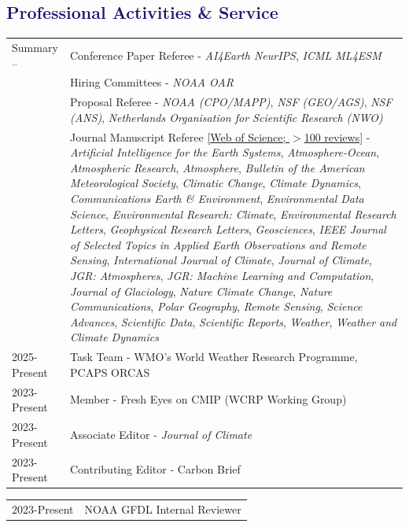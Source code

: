 \documentclass[margin,line,palatino,courier,10pt]{res}
\begin{document}
\begin{resume}
\section{\sc \textcolor{MidnightBlue}{\large{\textbf{Professional Activities \& Service}}}}
\vspace*{0.05in}
\begin{tabular}{@{}p{0.9in}p{4in}}
 Summary -- & Conference Paper Referee - \textit{AI4Earth NeurIPS}, \textit{ICML ML4ESM}\\
 & Hiring Committees - \textit{NOAA OAR}\\
 & Proposal Referee - \textit{NOAA (CPO/MAPP)}, \textit{NSF (GEO/AGS)}, \textit{NSF (ANS)}, \textit{Netherlands Organisation for Scientific Research (NWO)}\\
 & Journal Manuscript Referee \href{https://www.webofscience.com/wos/author/record/J-4764-2019}{[Web of Science; $>$100 reviews]} - \textit{Artificial Intelligence for the Earth Systems}, \textit{Atmosphere-Ocean}, \textit{Atmospheric Research}, \textit{Atmosphere}, \textit{Bulletin of the American Meteorological Society}, \textit{Climatic Change}, \textit{Climate Dynamics}, \textit{Communications Earth \& Environment}, \textit{Environmental Data Science}, \textit{Environmental Research: Climate}, \textit{Environmental Research Letters}, \textit{Geophysical Research Letters}, \textit{Geosciences}, \textit{IEEE Journal of Selected Topics in Applied Earth Observations and Remote Sensing}, \textit{International Journal of Climate}, \textit{Journal of Climate}, \textit{JGR: Atmospheres}, \textit{JGR: Machine Learning and Computation}, \textit{Journal of Glaciology}, \textit{Nature Climate Change}, \textit{Nature Communications}, \textit{Polar Geography}, \textit{Remote Sensing}, \textit{Science Advances}, \textit{Scientific Data}, \textit{Scientific Reports}, \textit{Weather}, \textit{Weather and Climate Dynamics} \\
2025-Present & Task Team - WMO's World Weather Research Programme, PCAPS ORCAS\\
2023-Present & Member - Fresh Eyes on CMIP (WCRP Working Group)\\
2023-Present & Associate Editor - \textit{Journal of Climate}\\
2023-Present & Contributing Editor - Carbon Brief\\
\end{tabular}
\begin{tabular}{@{}p{0.9in}p{4in}}
2023-Present & NOAA GFDL Internal Reviewer\\

\end{tabular}
\end{resume}
\end{document}
